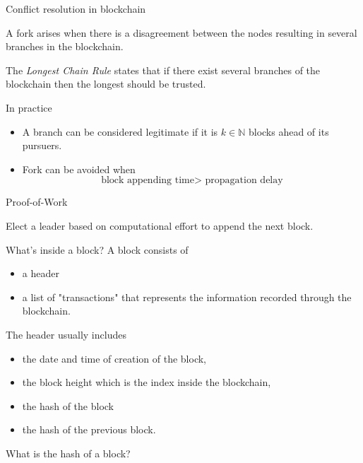 \documentclass{beamer}
\begin{document}
\begin{frame}{Conflict resolution in blockchain}
\begin{tcolorbox}[enhanced,drop shadow, title=Fork]
    A fork arises when there is a disagreement between the nodes resulting in several branches in the blockchain.
\end{tcolorbox}
\begin{tcolorbox}[enhanced,drop shadow, title=LCR]
    The \textit{Longest Chain Rule} states that if there exist several branches of the blockchain then the longest should be trusted.
\end{tcolorbox}
In practice 
\begin{itemize}
  \item A branch can be considered legitimate if it is $k\in\mathbb{N}$ blocks ahead of its pursuers.
  \item Fork can be avoided when
  $$
  \text{block appending time}> \text{ propagation delay} 
  $$
\end{itemize}
\end{frame}
\begin{frame}{Proof-of-Work}
\begin{tcolorbox}[enhanced,drop shadow, title=Objective]
    Elect a leader based on computational effort to append the next block.
\end{tcolorbox}
\end{frame}
\begin{frame}{What's inside a block?}
A block consists of 
\begin{itemize}
\item a header 
\item a list of "transactions" that represents the information recorded through the blockchain. 
\end{itemize}
The header usually includes 
\begin{itemize}
\item the date and time of creation of the block, 
\item the block height which is the index inside the blockchain, 
\item the hash of the block 
\item the hash of the previous block. 
\end{itemize}
\begin{tcolorbox}[enhanced,drop shadow, title=Question]
What is the hash of a block?
\end{tcolorbox}
\end{frame}
\end{document}
